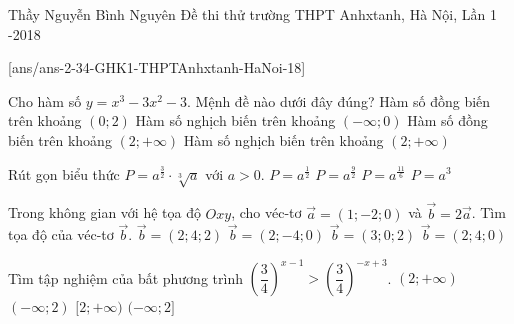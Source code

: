 \begin{name}
	{Thầy Nguyễn Bình Nguyên}
	{Đề thi thử trường THPT Anhxtanh, Hà Nội, Lần 1 -2018}
\end{name}

[ans/ans-2-34-GHK1-THPTAnhxtanh-HaNoi-18]
\setcounter{ex}{0} 
\begin{ex}%
	Cho hàm số $y=x^3-3x^2-3$. Mệnh đề nào dưới đây đúng?
	\choice
	{Hàm số đồng biến trên khoảng $(0;2)$}
	{Hàm số nghịch biến trên khoảng $(-\infty;0)$}
	{\True Hàm số đồng biến trên khoảng $(2;+\infty)$}
	{Hàm số nghịch biến trên khoảng $(2;+\infty)$}
\end{ex}

\begin{ex}%
	Rút gọn biểu thức $P=a^{\frac{3}{2}}\cdot \sqrt[3]{a}$ với $a>0$.
	\choice
	{$P=a^{\frac{1}{2}}$}
	{$P=a^{\frac{9}{2}}$}
	{\True $P=a^{\frac{11}{6}}$}
	{$P=a^{3}$}
\end{ex}

\begin{ex}%
	Trong không gian với hệ tọa độ $Oxy$, cho véc-tơ $\vec{a}=(1;-2;0)$ và $\vec{b}=2\vec{a}$. Tìm tọa độ của véc-tơ $\vec{b}$.
	\choice
	{$\vec{b}=(2;4;2)$}
	{\True $\vec{b}=(2;-4;0)$}
	{$\vec{b}=(3;0;2)$}
	{$\vec{b}=(2;4;0)$}
\end{ex}

\begin{ex}%
	Tìm tập nghiệm của bất phương trình $\left(\dfrac{3}{4}\right)^{x-1}>\left(\dfrac{3}{4}\right)^{-x+3}$.
	\choice
	{$(2;+\infty)$}
	{\True $(-\infty;2)$}
	{$[2;+\infty)$}
	{$(-\infty;2]$}
\end{ex}

